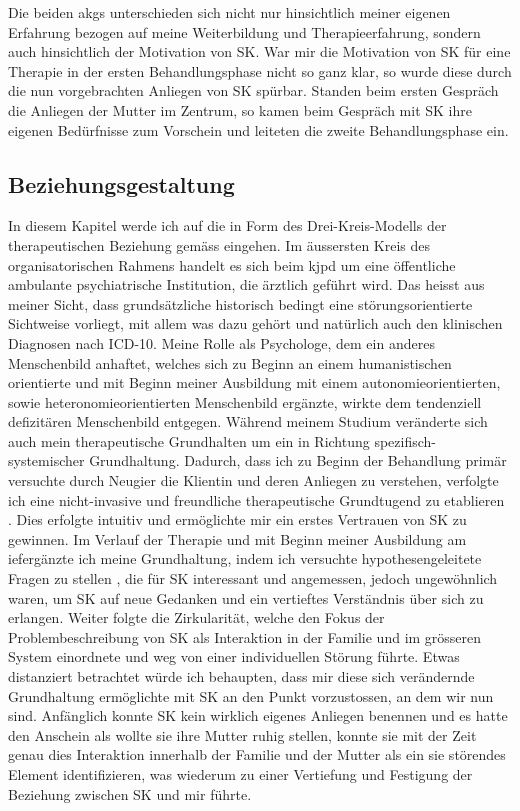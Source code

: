 Die beiden \acp{akg} unterschieden sich nicht nur hinsichtlich meiner eigenen Erfahrung bezogen auf meine Weiterbildung und Therapieerfahrung, sondern auch hinsichtlich der Motivation von SK. War mir die Motivation von SK für eine Therapie in der ersten Behandlungsphase nicht so ganz klar, so wurde diese durch die nun vorgebrachten Anliegen von SK spürbar. Standen beim ersten Gespräch die Anliegen der Mutter im Zentrum, so kamen beim Gespräch mit SK ihre eigenen Bedürfnisse zum Vorschein und leiteten die zweite Behandlungsphase ein. 


\subsection{Beziehungsgestaltung} \label{lbBeziehungsgestaltung}  
In diesem Kapitel werde ich auf die  in Form des Drei-Kreis-Modells der therapeutischen Beziehung gemäss  eingehen. Im äussersten Kreis des organisatorischen Rahmens handelt es sich beim \ac{kjpd} um eine öffentliche ambulante psychiatrische Institution, die ärztlich geführt wird. Das heisst aus meiner Sicht, dass grundsätzliche historisch bedingt eine störungsorientierte Sichtweise vorliegt, mit allem was dazu gehört und natürlich auch den klinischen Diagnosen nach ICD-10. Meine Rolle als Psychologe, dem ein anderes Menschenbild anhaftet, welches sich zu Beginn an einem humanistischen orientierte und mit Beginn meiner Ausbildung mit einem autonomieorientierten, sowie heteronomieorientierten Menschenbild ergänzte, wirkte dem tendenziell defizitären Menschenbild entgegen. Während meinem Studium veränderte sich auch mein therapeutische Grundhalten um ein in Richtung spezifisch-systemischer Grundhaltung. Dadurch, dass ich zu Beginn der Behandlung primär versuchte durch Neugier die Klientin und deren Anliegen zu verstehen, verfolgte ich eine nicht-invasive und freundliche therapeutische Grundtugend zu etablieren \cite{Cecchin1988}. Dies erfolgte intuitiv und ermöglichte mir ein erstes Vertrauen von SK zu gewinnen. Im Verlauf der Therapie und mit Beginn meiner Ausbildung am \ac{ief}ergänzte ich meine Grundhaltung, indem ich versuchte hypothesengeleitete Fragen zu stellen \cite{Andersen1990}, die für SK interessant und angemessen, jedoch ungewöhnlich waren, um SK auf neue Gedanken und ein vertieftes Verständnis über sich zu erlangen. Weiter folgte die Zirkularität, welche den Fokus der Problembeschreibung von SK als Interaktion in der Familie und im grösseren System einordnete und weg von einer individuellen Störung führte. Etwas distanziert betrachtet würde ich behaupten, dass mir diese sich verändernde Grundhaltung ermöglichte mit SK an den Punkt vorzustossen, an dem wir nun sind. Anfänglich konnte SK kein wirklich eigenes Anliegen benennen und es hatte den Anschein als wollte sie ihre Mutter ruhig stellen, konnte sie mit der Zeit genau dies Interaktion innerhalb der Familie und der Mutter als ein sie störendes Element identifizieren, was wiederum zu einer Vertiefung und Festigung der Beziehung zwischen SK und mir führte.

